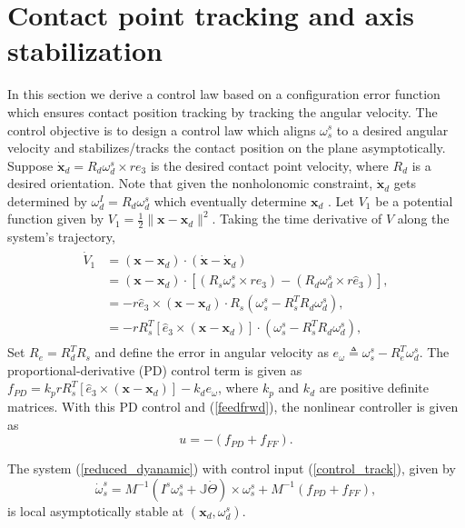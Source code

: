\documentclass{ifacconf}
\begin{document}
\section{Contact point tracking and axis stabilization}
In this section we derive a control law based on a configuration error function which ensures contact position tracking by tracking the angular velocity. The control objective is to design a control law which aligns $\omega_{s}^{s}$ to a desired angular velocity and stabilizes/tracks the contact position on the plane asymptotically. Suppose $\dot{\mathbf{x}}_{d} = R_{d}\omega_{d}^{s} \times r e_{3}$ is the desired contact point velocity, where $R_{d}$ is a desired orientation. Note that given the nonholonomic constraint, $\dot{\mathbf{x}}_{d}$ gets determined by $\omega_{d}^{I} = R_{d} \omega_{d}^{s}$ which eventually determine $\mathbf{x}_{d}$ . Let $V_{1}$ be a potential function given by $V_{1} = \frac{1}{2}\| \mathbf{x} - \mathbf{x}_{d} \|^{2}.$
Taking the time derivative of $V$ along the system's trajectory,
\begin{align}\label{track_eq1}
\begin{split}
\dot{V}_{1} & = (\mathbf{x} - \mathbf{x}_{d}) \cdot (\dot{\mathbf{x}} - \dot{\mathbf{x}}_{d}) \\
& = (\mathbf{x} - \mathbf{x}_{d}) \cdot [(R_{s}\omega_{s}^{s} \times r \hat{e}_{3}) -  (R_{d}\omega_{d}^{s} \times r \hat{e}_{3})],\\
& = - r \hat{e}_{3} \times (\mathbf{x} - \mathbf{x}_{d}) \cdot R_{s}(\omega_{s}^{s} - R_{s}^{T}R_{d}\omega_{d}^{s}), \\
& =  - r R_{s}^{T}[\hat{e}_{3} \times (\mathbf{x} - \mathbf{x}_{d})] \cdot (\omega_{s}^{s} - R_{s}^{T}R_{d}\omega_{d}^{s}),
\end{split}
\end{align}
Set $R_{e} = R_{d}^{T}R_{s}$ and define the error in angular velocity as $e_{\omega} \triangleq \omega_{s}^{s} - R_{e}^{T}\omega_{d}^{s}$. The proportional-derivative (PD) control term is given as $f_{PD} = k_{p}r R_{s}^{T}[\hat{e}_{3} \times (\mathbf{x} - \mathbf{x}_{d})] - k_{d}e_{\omega}$, 
where $k_{p}$ and $k_{d}$ are positive definite matrices. With this PD control and (\ref{feedfrwd}), the nonlinear controller is given as
\begin{equation}\label{control_track}
u = -(f_{PD} + f_{FF}).
\end{equation}
\begin{thm}
The system (\ref{reduced_dyanamic}) with control input (\ref{control_track}), given by
\begin{equation}\nonumber
\dot{\omega}_{s}^{s} = M^{-1}(I^{s} \omega_{s}^{s} + \mathbb{J}\dot{\Theta}) \times \omega_{s}^{s} + M^{-1}(f_{PD} +  f_{FF}) ,
\end{equation}
is local asymptotically stable at $(\mathbf{x}_{d},\omega_{d}^{s})$.
\end{thm}
\end{document}
